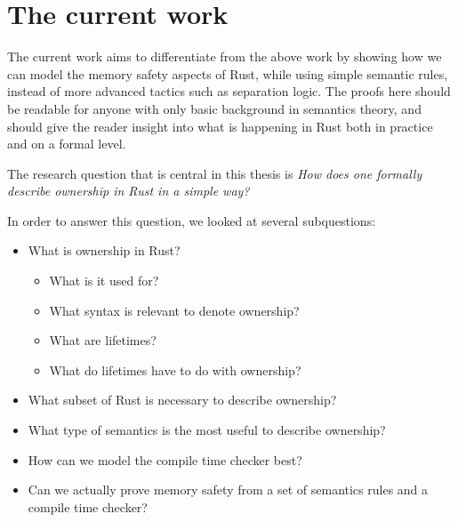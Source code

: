 \section{The current work}
The current work aims to differentiate from the above work by showing how we can model the memory safety aspects of Rust, while using simple semantic rules, instead of more advanced tactics such as separation logic. The proofs here should be readable for anyone with only basic background in semantics theory, and should give the reader insight into what is happening in Rust both in practice and on a formal level. 

The research question that is central in this thesis is \emph{How does one formally describe ownership in Rust in a simple way?}

In order to answer this question, we looked at several subquestions:

\begin{itemize}[noitemsep]
    \item What is ownership in Rust?
    \begin{itemize}[noitemsep]
        \item What is it used for?
        \item What syntax is relevant to denote ownership?
        \item What are lifetimes?
        \item What do lifetimes have to do with ownership?
    \end{itemize}
    \item What subset of Rust is necessary to describe ownership?
    \item What type of semantics is the most useful to describe ownership?
    \item How can we model the compile time checker best?
    \item Can we actually prove memory safety from a set of semantics rules and a compile time checker?
\end{itemize}



